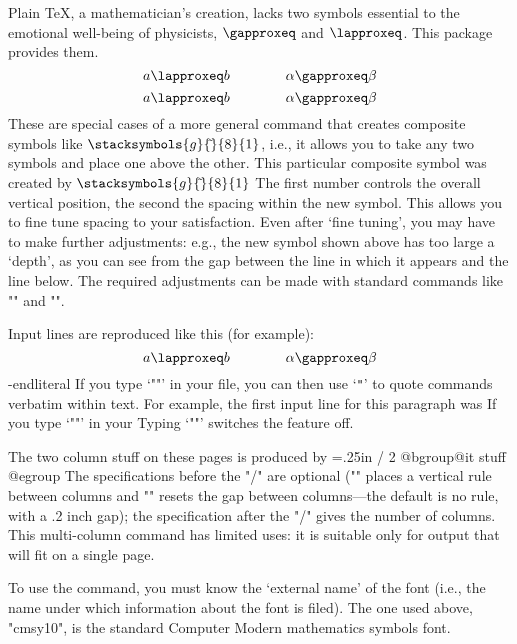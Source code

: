 \bigskip
{}
Plain \TeX, a mathematician's creation, lacks two symbols essential to the
emotional well-being of physicists, $\gapproxeq$ and $\lapproxeq$. This
package provides them.
\medskip
\beginex
$$a\lapproxeq b \qquad\qquad
\alpha\gapproxeq\beta $$
\endex
\beginliteral
$$a\lapproxeq b \qquad\qquad
\alpha\gapproxeq\beta $$
\endliteral
\noindent These are special cases of a more general command that creates
composite symbols like $\stacksymbols{g}{\tilde{}}{8}{1}$, i.e.,
it allows you to take any two symbols and place one above the other. This
particular composite symbol was created by
\beginliteral
$\stacksymbols{g}{\tilde{}}{8}{1}$
\endliteral
\noindent The first number controls the overall vertical position, the second
the spacing within the new symbol. This allows you to fine tune spacing to your
satisfaction. Even after `fine tuning', you may have to make further
adjustments: e.g., the new symbol shown above has too large a `depth', as you
can see from the gap between the line in which it appears and the line below.
The required adjustments can be made with standard commands like "\smash"
and "\vphantom".

\bigskip
{}
Input lines are reproduced like this (for example):
\beginliteral
\beginliteral
$$a\lapproxeq b \qquad\qquad
\alpha\gapproxeq\beta $$
\@-endliteral
\endliteral
\noindent If you type `"\vquotingon"' in your
\vquotingoff
file, you can then use `{\tt"}' to quote commands verbatim
within text. For example, the first input line for this paragraph was
\vquotingon
\beginliteral
\noindent If you type `"\vquotingon"' in your
\endliteral
\noindent Typing `"\vquotingoff"' switches the feature off.

\bigskip
{}
The two column stuff on these pages is produced by
\beginliteral
\beginart \dividerule \coljump=.25in / {2}
@bgroup@it stuff @egroup
\endart
\endliteral
\noindent
The specifications before the "/" are optional ("\dividerule" places a
vertical rule between columns and "\coljump" resets the gap between
columns---the default is no rule, with a .2 inch gap); the
specification after the "/" gives the number of columns. This multi-column
command has limited uses: it is suitable only for output that will fit on a
single page.
\endpage

\newpage
{}
\beginex
{}
\endex
\beginliteral
{}
\endliteral
\noindent To use the command, you must know the `external name' of the
font (i.e., the name under which information about the font
is filed). The one used above, "cmsy10", is the standard Computer Modern
mathematics symbols font.

